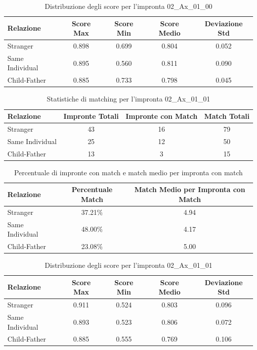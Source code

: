 \begin{table}[htbp]
\centering
\caption{Distribuzione degli score per l'impronta 02\_Ax\_01\_00}
\label{tab:scores_02_Ax_01_00}
\begin{tabular}{|l|c|c|c|c|}
\hline
\textbf{Relazione} & \textbf{Score Max} & \textbf{Score Min} & \textbf{Score Medio} & \textbf{Deviazione Std} \\
\hline
Stranger & 0.898 & 0.699 & 0.804 & 0.052 \\
\hline
Same Individual & 0.895 & 0.560 & 0.811 & 0.090 \\
\hline
Child-Father & 0.885 & 0.733 & 0.798 & 0.045 \\
\hline
\end{tabular}
\end{table}


\begin{table}[htbp]
\centering
\caption{Statistiche di matching per l'impronta 02\_Ax\_01\_01}
\label{tab:results_02_Ax_01_01}
\begin{tabular}{|l|c|c|c|}
\hline
\textbf{Relazione} & \textbf{Impronte Totali} & \textbf{Impronte con Match} & \textbf{Match Totali} \\
\hline
Stranger & 43 & 16 & 79 \\
\hline
Same Individual & 25 & 12 & 50 \\
\hline
Child-Father & 13 & 3 & 15 \\
\hline
\end{tabular}
\end{table}


\begin{table}[htbp]
\centering
\caption{Percentuale di impronte con match e match medio per impronta con match}
\label{tab:match_percentage_02_Ax_01_01}
\begin{tabular}{|l|c|c|}
\hline
\textbf{Relazione} & \textbf{Percentuale Match} & \textbf{Match Medio per Impronta con Match} \\
\hline
Stranger & 37.21\% & 4.94 \\
\hline
Same Individual & 48.00\% & 4.17 \\
\hline
Child-Father & 23.08\% & 5.00 \\
\hline
\end{tabular}
\end{table}


\begin{table}[htbp]
\centering
\caption{Distribuzione degli score per l'impronta 02\_Ax\_01\_01}
\label{tab:scores_02_Ax_01_01}
\begin{tabular}{|l|c|c|c|c|}
\hline
\textbf{Relazione} & \textbf{Score Max} & \textbf{Score Min} & \textbf{Score Medio} & \textbf{Deviazione Std} \\
\hline
Stranger & 0.911 & 0.524 & 0.803 & 0.096 \\
\hline
Same Individual & 0.893 & 0.523 & 0.806 & 0.072 \\
\hline
Child-Father & 0.885 & 0.555 & 0.769 & 0.106 \\
\hline
\end{tabular}
\end{table}



